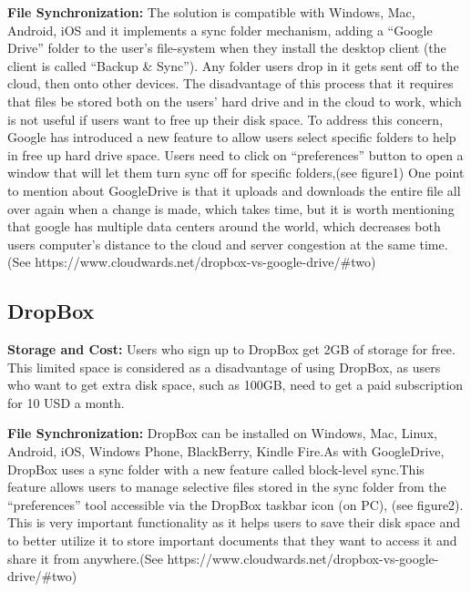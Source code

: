 \documentclass{article}
\begin{document}
\newline
\hfill \break %
\textbf{File Synchronization:}
The solution is compatible with Windows, Mac, Android, iOS and it implements a sync folder mechanism, adding a “Google Drive” folder to the user's file-system when they install the desktop client (the client is called “Backup & Sync”). Any folder users drop in it gets sent off to the cloud, then onto other devices. The disadvantage of this process that it requires that files be stored both on the users’ hard drive and in the cloud to work, which is not useful if users want to free up their disk space. To address this concern, Google has introduced a new feature to allow users select specific folders to help in free up hard drive space. Users need to click on “preferences” button to open a window that will let them turn sync off for specific folders,(see figure1)
One point to mention about GoogleDrive is that it uploads and downloads the entire file all over again when a change is made, which takes time, but it is worth mentioning that google has multiple data centers around the world, which decreases both users computer’s distance to the cloud and server congestion at the same time. (See https://www.cloudwards.net/dropbox-vs-google-drive/#two)


\subsection{DropBox}
\textbf{Storage and Cost:}
Users who sign up to DropBox get 2GB of storage for free. This limited space is considered as a disadvantage of using DropBox, as users who want to get extra disk space, such as 100GB, need to get a paid subscription for 10 USD a month.

\newline
\hfill \break
\textbf{File Synchronization:}
DropBox can be installed on Windows, Mac, Linux, Android, iOS, Windows Phone, BlackBerry, Kindle Fire.As with GoogleDrive, DropBox uses a sync folder with a new feature called block-level sync.This feature allows users to manage selective files stored in the sync folder from the “preferences” tool accessible via the DropBox taskbar icon (on PC), (see figure2). This is very important functionality as it helps users to save their disk space and to better utilize it to store important documents that they want to access it and share it from anywhere.(See https://www.cloudwards.net/dropbox-vs-google-drive/#two)

\newline
\hfill \break
\end{document}
